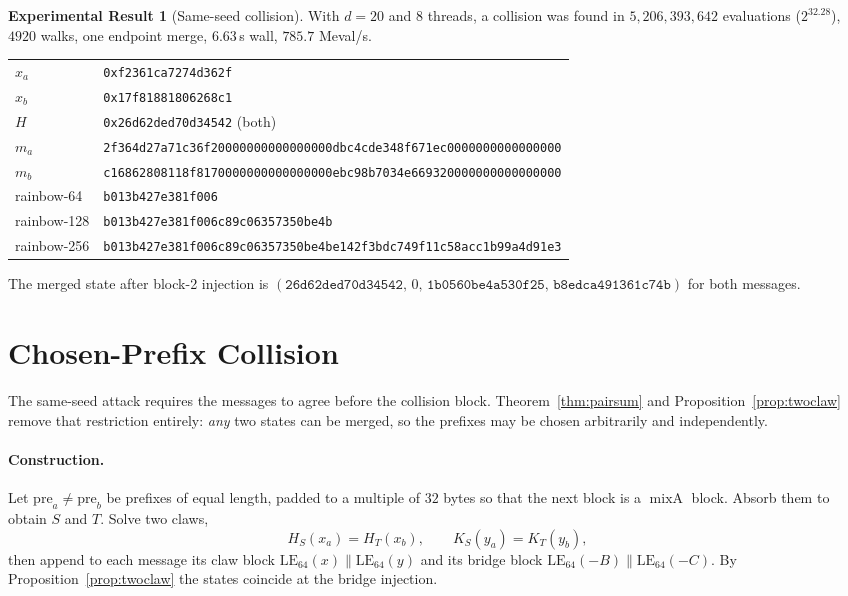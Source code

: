 \documentclass[10pt]{article}
\theoremstyle{definition}
\newtheorem{result}{Experimental Result}
\newcommand{\mixA}{\operatorname{mixA}}
\newcommand{\code}[1]{\texttt{#1}}
\begin{document}
\begin{result}[Same-seed collision]
\label{res:sameiv}
With $d=20$ and 8 threads, a collision was found in $5{,}206{,}393{,}642$ evaluations ($2^{32.28}$), $4920$ walks, one endpoint merge, $6.63$\,s wall, $785.7$ Meval/s.
\begin{center}\footnotesize
\begin{tabularx}{\linewidth}{@{}lX@{}}
\toprule
$x_a$ & \code{0xf2361ca7274d362f} \\
$x_b$ & \code{0x17f81881806268c1} \\
$H$   & \code{0x26d62ded70d34542} (both) \\
$m_a$ & \code{2f364d27a71c36f20000000000000000dbc4cde348f671ec0000000000000000} \\
$m_b$ & \code{c16862808118f8170000000000000000ebc98b7034e669320000000000000000} \\
\midrule
rainbow-64  & \code{b013b427e381f006} \\
rainbow-128 & \code{b013b427e381f006c89c06357350be4b} \\
rainbow-256 & \code{b013b427e381f006c89c06357350be4be142f3bdc749f11c58acc1b99a4d91e3} \\
\bottomrule
\end{tabularx}
\end{center}
The merged state after block-2 injection is $(\code{26d62ded70d34542},\,0,\,\code{1b0560be4a530f25},\,\code{b8edca491361c74b})$ for both messages.
\end{result}

\section{Chosen-Prefix Collision}
\label{sec:chosenprefix}

The same-seed attack requires the messages to agree before the collision block. Theorem~\ref{thm:pairsum} and Proposition~\ref{prop:twoclaw} remove that restriction entirely: \emph{any} two states can be merged, so the prefixes may be chosen arbitrarily and independently.

\paragraph{Construction.} Let $\mathrm{pre}_a \neq \mathrm{pre}_b$ be prefixes of equal length, padded to a multiple of $32$ bytes so that the next block is a $\mixA$ block. Absorb them to obtain $S$ and $T$. Solve two claws,
\[
  H_S(x_a) = H_T(x_b), \qquad K_S(y_a) = K_T(y_b),
\]
then append to each message its claw block $\mathrm{LE}_{64}(x)\|\mathrm{LE}_{64}(y)$ and its bridge block $\mathrm{LE}_{64}(-B)\|\mathrm{LE}_{64}(-C)$. By Proposition~\ref{prop:twoclaw} the states coincide at the bridge injection.
\end{document}
